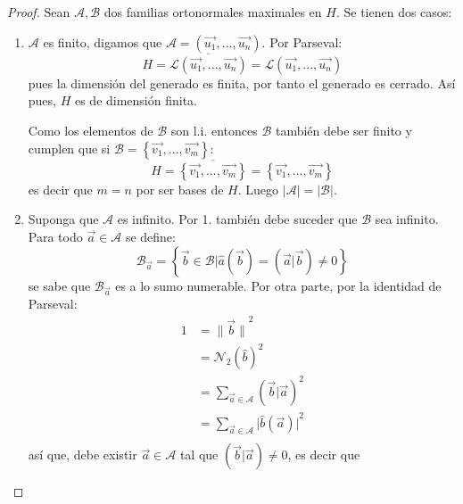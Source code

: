 \documentclass[12pt]{report}
\theoremstyle{largebreak}
\newcommand\abs[1]{\ensuremath{\big|#1\big|}}
\newcommand\norm[1]{\ensuremath{\|#1\|}}
\newcommand\pint[2]{\ensuremath{\left(#1\big| #2\right)}}
\newcommand{\N}[2]{\ensuremath{\mathcal{N}_{#1}\left(#2\right)}}
\begin{document}
    \begin{proof}
        Sean $\mathcal{A},\mathcal{B}$ dos familias ortonormales maximales en $H$. Se tienen dos casos:
        \begin{enumerate}
            \item $\mathcal{A}$ es finito, digamos que $\mathcal{A}=\left(\vec{u_1},...,\vec{u_n} \right)$. Por Parseval:
            \begin{equation*}
                H=\overline{\mathcal{L}(\vec{u_1},...,\vec{u_n})}=\mathcal{L}(\vec{u_1},...,\vec{u_n})
            \end{equation*}
            pues la dimensión del generado es finita, por tanto el generado es cerrado. Así pues, $H$ es de dimensión finita.
            
            Como los elementos de $\mathcal{B}$ son l.i. entonces $\mathcal{B}$ también debe ser finito y cumplen que si $\mathcal{B}=\left\{\vec{v_1},...,\vec{v_m} \right\}$:
            \begin{equation*}
                H=\overline{\left\{\vec{v_1},...,\vec{v_m} \right\}}=\left\{\vec{v_1},...,\vec{v_m} \right\}
            \end{equation*}
            es decir que $m=n$ por ser bases de $H$. Luego $\abs{\mathcal{A}}=\abs{\mathcal{B}}$.
            \item Suponga que $\mathcal{A}$ es infinito. Por 1. también debe suceder que $\mathcal{B}$ sea infinito. Para todo $\vec{a}\in\mathcal{A}$ se define:
            \begin{equation*}
                \mathcal{B}_{\vec{a}}=\left\{\vec{b}\in\mathcal{B}\Big|\hat{a}(\vec{b})=\pint{\vec{a}}{\vec{b}}\neq0 \right\}
            \end{equation*}
            se sabe que $\mathcal{B}_{\vec{a}}$ es a lo sumo numerable. Por otra parte, por la identidad de Parseval:
            \begin{equation*}
                \begin{split}
                    1&=\norm{\vec{b}}^2\\
                    &=\N{2}{\hat{b}}^2\\
                    &=\sum_{\vec{a}\in\mathcal{A}}\pint{\vec{b}}{\vec{a}}^2\\
                    &=\sum_{\vec{a}\in\mathcal{A}}\abs{\hat{b}(\vec{a})}^2\\
                \end{split}
            \end{equation*}
            así que, debe existir $\vec{a}\in\mathcal{A}$ tal que $\pint{\vec{b}}{\vec{a}}\neq0$, es decir que

\end{enumerate}
\end{proof}
\end{document}
